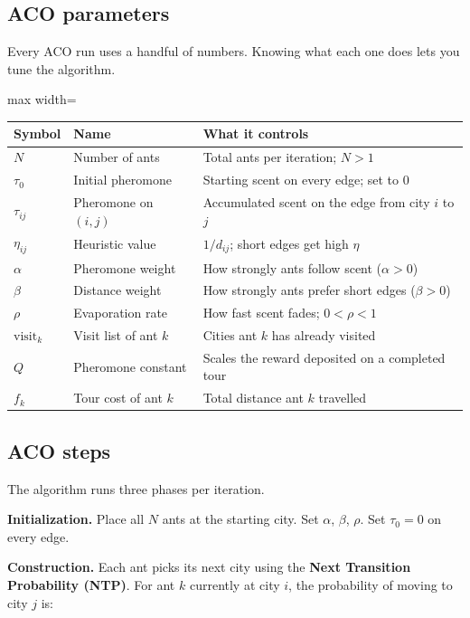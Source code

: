 \documentclass[a4paper,11pt]{article}
\newcommand{\vocab}[1]{\textbf{\color{navy}#1}}
\begin{document}
\subsection{ACO parameters}

Every ACO run uses a handful of numbers.
Knowing what each one does lets you tune the algorithm.

\medskip
\begin{adjustbox}{max width=\linewidth}
\begin{tabular}{@{}p{1.6cm}p{3.5cm}p{8cm}@{}}
\toprule
\textbf{Symbol} & \textbf{Name} & \textbf{What it controls} \\
\midrule
$N$           & Number of ants     & Total ants per iteration; $N > 1$ \\
$\tau_0$      & Initial pheromone  & Starting scent on every edge; set to 0 \\
$\tau_{ij}$   & Pheromone on $(i,j)$ & Accumulated scent on the edge from city $i$ to $j$ \\
$\eta_{ij}$   & Heuristic value    & $1/d_{ij}$; short edges get high $\eta$ \\
$\alpha$      & Pheromone weight   & How strongly ants follow scent ($\alpha > 0$) \\
$\beta$       & Distance weight    & How strongly ants prefer short edges ($\beta > 0$) \\
$\rho$        & Evaporation rate   & How fast scent fades; $0 < \rho < 1$ \\
$\text{visit}_k$ & Visit list of ant $k$ & Cities ant $k$ has already visited \\
$Q$           & Pheromone constant & Scales the reward deposited on a completed tour \\
$f_k$         & Tour cost of ant $k$ & Total distance ant $k$ travelled \\
\bottomrule
\end{tabular}
\end{adjustbox}

\subsection{ACO steps}

The algorithm runs three phases per iteration.

\medskip
\noindent\textbf{Initialization.}
Place all $N$ ants at the starting city.
Set $\alpha$, $\beta$, $\rho$.
Set $\tau_0 = 0$ on every edge.

\medskip
\noindent\textbf{Construction.}
Each ant picks its next city using the
\vocab{Next Transition Probability (NTP)}.
For ant $k$ currently at city $i$, the probability of moving to city $j$ is:
\end{document}
